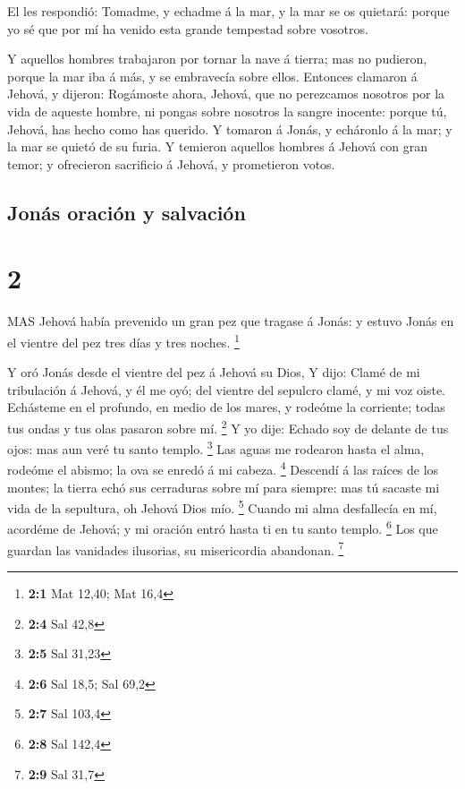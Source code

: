  El les respondió: Tomadme, y echadme á la mar, y la mar se
os quietará: porque yo sé que por mí ha venido esta grande tempestad
sobre vosotros.

 Y aquellos hombres trabajaron por tornar la nave á tierra;
mas no pudieron, porque la mar iba á más, y se embravecía sobre ellos.
 Entonces clamaron á Jehová, y dijeron: Rogámoste ahora,
Jehová, que no perezcamos nosotros por la vida de aqueste hombre, ni
pongas sobre nosotros la sangre inocente: porque tú, Jehová, has hecho
como has querido.  Y tomaron á Jonás, y echáronlo á la mar;
y la mar se quietó de su furia.  Y temieron aquellos
hombres á Jehová con gran temor; y ofrecieron sacrificio á Jehová, y
prometieron votos. 

\hypertarget{jonuxe1s-oraciuxf3n-y-salvaciuxf3n}{%
\subsection{Jonás oración y
salvación}\label{jonuxe1s-oraciuxf3n-y-salvaciuxf3n}}

\hypertarget{section-1}{%
\section{2}\label{section-1}}

 MAS Jehová había prevenido un gran pez que tragase á Jonás:
y estuvo Jonás en el vientre del pez tres días y tres noches.
\footnote{\textbf{2:1} Mat 12,40; Mat 16,4}

 Y oró Jonás desde el vientre del pez á Jehová su Dios,
 Y dijo: Clamé de mi tribulación á Jehová, y él me oyó; del
vientre del sepulcro clamé, y mi voz oiste.  Echásteme en el
profundo, en medio de los mares, y rodeóme la corriente; todas tus ondas
y tus olas pasaron sobre mí. \footnote{\textbf{2:4} Sal 42,8}
 Y yo dije: Echado soy de delante de tus ojos: mas aun veré
tu santo templo. \footnote{\textbf{2:5} Sal 31,23}  Las
aguas me rodearon hasta el alma, rodeóme el abismo; la ova se enredó á
mi cabeza. \footnote{\textbf{2:6} Sal 18,5; Sal 69,2} 
Descendí á las raíces de los montes; la tierra echó sus cerraduras sobre
mí para siempre: mas tú sacaste mi vida de la sepultura, oh Jehová Dios
mío. \footnote{\textbf{2:7} Sal 103,4}  Cuando mi alma
desfallecía en mí, acordéme de Jehová; y mi oración entró hasta ti en tu
santo templo. \footnote{\textbf{2:8} Sal 142,4}  Los que
guardan las vanidades ilusorias, su misericordia abandonan. \footnote{\textbf{2:9}
  Sal 31,7}

